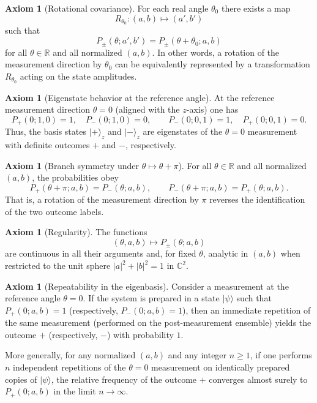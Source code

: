 \documentclass[11pt,a4paper]{article}
\numberwithin{equation}{section}
\theoremstyle{definition}
\newtheorem{axiom}[theorem]{Axiom}
\begin{document}
\begin{axiom}[Rotational covariance]
\label{ax:rotation}
For each real angle $\theta_0$ there exists a map
\[
R_{\theta_0} : (a,b)\mapsto(a',b')
\]
such that
\[
P_{\pm}(\theta;a',b') = P_{\pm}(\theta+\theta_0; a,b)
\]
for all $\theta\in\mathbb{R}$ and all normalized $(a,b)$. In other words, a rotation of the measurement direction by $\theta_0$ can be equivalently represented by a transformation $R_{\theta_0}$ acting on the state amplitudes.
\end{axiom}

\begin{axiom}[Eigenstate behavior at the reference angle]
\label{ax:eigenstates}
At the reference measurement direction $\theta=0$ (aligned with the $z$-axis) one has
\[
P_+(0;1,0)=1,\quad P_-(0;1,0)=0,\qquad
P_-(0;0,1)=1,\quad P_+(0;0,1)=0.
\]
Thus, the basis states $|+\rangle_z$ and $|-\rangle_z$ are eigenstates of the $\theta=0$ measurement with definite outcomes $+$ and $-$, respectively.
\end{axiom}

\begin{axiom}[Branch symmetry under $\theta\mapsto\theta+\pi$]
\label{ax:branch-symmetry}
For all $\theta\in\mathbb{R}$ and all normalized $(a,b)$, the probabilities obey
\[
P_+(\theta+\pi;a,b) = P_-(\theta;a,b),\qquad
P_-(\theta+\pi;a,b) = P_+(\theta;a,b).
\]
That is, a rotation of the measurement direction by $\pi$ reverses the identification of the two outcome labels.
\end{axiom}

\begin{axiom}[Regularity]
\label{ax:regularity}
The functions
\[
(\theta,a,b)\longmapsto P_{\pm}(\theta;a,b)
\]
are continuous in all their arguments and, for fixed $\theta$, analytic in $(a,b)$ when restricted to the unit sphere $|a|^2+|b|^2=1$ in $\mathbb{C}^2$.
\end{axiom}

\begin{axiom}[Repeatability in the eigenbasis]
\label{ax:repeatability}
Consider a measurement at the reference angle $\theta=0$. If the system is prepared in a state $|\psi\rangle$ such that $P_+(0;a,b)=1$ (respectively, $P_-(0;a,b)=1$), then an immediate repetition of the same measurement (performed on the post-measurement ensemble) yields the outcome $+$ (respectively, $-$) with probability $1$.

More generally, for any normalized $(a,b)$ and any integer $n\ge 1$, if one performs $n$ independent repetitions of the $\theta=0$ measurement on identically prepared copies of $|\psi\rangle$, the relative frequency of the outcome $+$ converges almost surely to $P_+(0;a,b)$ in the limit $n\to\infty$.
\end{axiom}
\end{document}
